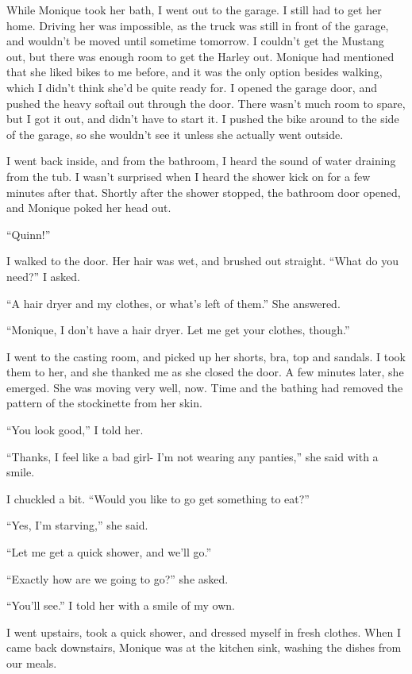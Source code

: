 While Monique took her bath, I went out to the garage. I still had to get her home.
Driving her was impossible, as the truck was still in front of the garage, and wouldn't be moved
until sometime tomorrow. I couldn't get the Mustang out, but there was enough room to get the
Harley out. Monique had mentioned that she liked bikes to me before, and it was the only option
besides walking, which I didn't think she'd be quite ready for. I opened the garage door, and
pushed the heavy softail out through the door. There wasn't much room to spare, but I got it
out, and didn't have to start it. I pushed the bike around to the side of the garage, so she
wouldn't see it unless she actually went outside.

I went back inside, and from the bathroom, I heard the sound of water draining from the
tub. I wasn't surprised when I heard the shower kick on for a few minutes after that. Shortly
after the shower stopped, the bathroom door opened, and Monique poked her head out.

``Quinn!''

I walked to the door. Her hair was wet, and brushed out straight. ``What do you need?'' I
asked.

``A hair dryer and my clothes, or what's left of them.'' She answered.

``Monique, I don't have a hair dryer. Let me get your clothes, though.''

I went to the casting room, and picked up her shorts, bra, top and sandals. I took them to
her, and she thanked me as she closed the door. A few minutes later, she emerged. She was moving
very well, now. Time and the bathing had removed the pattern of the stockinette from her skin.

``You look good,'' I told her.

``Thanks, I feel like a bad girl- I'm not wearing any panties,'' she said with a smile.

I chuckled a bit. ``Would you like to go get something to eat?''

``Yes, I'm starving,'' she said.

``Let me get a quick shower, and we'll go.''

``Exactly how are we going to go?'' she asked.

``You'll see.'' I told her with a smile of my own.

I went upstairs, took a quick shower, and dressed myself in fresh clothes. When I came back
downstairs, Monique was at the kitchen sink, washing the dishes from our meals.

